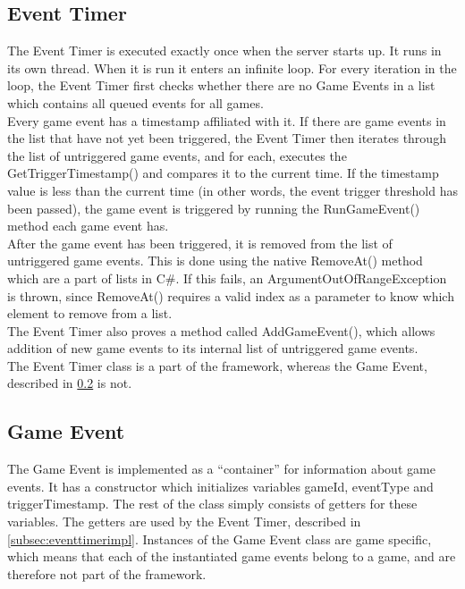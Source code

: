 \subsection{Event Timer}
\label{sec:eventtimerimpl}
The Event Timer is executed exactly once when the server starts up. It runs in its own thread. When it is run it enters an infinite loop. For every iteration in the loop, the Event Timer first checks whether there are no Game Events in a list which contains all queued events for all games.\\

Every game event has a timestamp affiliated with it. If there are game events in the list that have not yet been triggered, the Event Timer then iterates through the list of untriggered game events, and for each, executes the GetTriggerTimestamp() and compares it to the current time. If the timestamp value is less than the current time (in other words, the event trigger threshold has been passed), the game event is triggered by running the RunGameEvent() method each game event has.\\

After the game event has been triggered, it is removed from the list of untriggered game events. This is done using the native RemoveAt() method which are a part of lists in C\#. If this fails, an ArgumentOutOfRangeException is thrown, since RemoveAt() requires a valid index as a parameter to know which element to remove from a list.\\

The Event Timer also proves a method called AddGameEvent(), which allows addition of new game events to its internal list of untriggered game events.\\

The Event Timer class is a part of the framework, whereas the Game Event, described in \cref{subsec:geventImpl} is not.
\subsection{Game Event}\label{subsec:geventImpl}
The Game Event is implemented as a ``container'' for information about game events. It has a constructor which initializes variables gameId, eventType and triggerTimestamp. The rest of the class simply consists of getters for these variables. The getters are used by the Event Timer, described in \cref{subsec:eventtimerimpl}. Instances of the Game Event class are game specific, which means that each of the instantiated game events belong to a game, and are therefore not part of the framework.